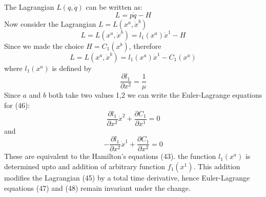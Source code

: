 \documentclass[14pt]{extarticle}
\begin{document}
The Lagrangian $L(q,\dot{q})$ can be written as:\\
\begin{equation}
L= p\dot{q} - H
\end{equation}
Now consider the Lagrangian $L=L\left(x^{a}, \dot{x}^{b}\right)$\\
\begin{equation}
L=L\left(x^{a}, \dot{x}^{b}\right)=l_{1}\left(x^{a}\right) \dot{x}^{1}-H
\end{equation}
Since we made the choice $H=C_{1}(x^{b})$, therefore \\
\begin{equation}
L=L\left(x^{a}, \dot{x}^{b}\right)=l_{1}\left(x^{a}\right) \dot{x}^{1}-C_{1}\left(x^{a}\right)
\end{equation}
where $l_{1}(x^{a})$ is defined by \\
\begin{equation}
\frac{\partial l_{1}}{\partial x^{2}}=\frac{1}{\mu}
\end{equation}
Since $a$ and $b$ both take two values 1,2 we can write the Euler-Lagrange equations for (46):\\
\begin{equation}
\frac{\partial l_{1}}{\partial x^{2}} \dot{x}^{2}+\frac{\partial C_{1}}{\partial x^{1}}=0
\end{equation}
and \\
\begin{equation}
-\frac{\partial l_{1}}{\partial x^{2}} \dot{x}^{1}+\frac{\partial C_{1}}{\partial x^{2}}=0
\end{equation}
These are equivalent to the Hamilton's equations (43). the function $l_{1}(x^{a})$ is determined upto and addition of arbitrary function $f_{1}(x^{1})$. This addition modifies the Lagrangian (45) by a total time derivative, hence Euler-Lagrange equations (47) and (48) remain invariant under the change.\\
\end{document}
